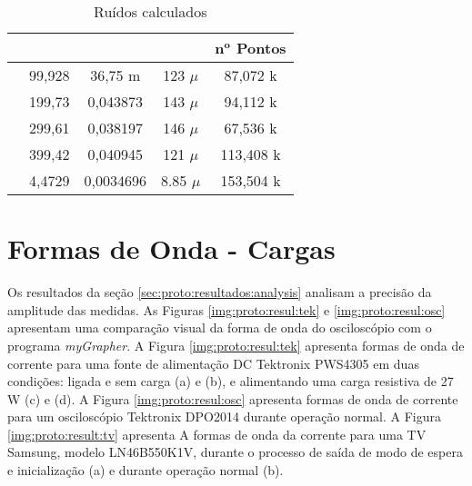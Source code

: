 				\begin{table}
					\caption{Ruídos calculados}
					\label{tab:proto:noise}
					\centering
					\begin{tabular}{c|c|c|c|c|}
						\cline{2-5}
						&		&		&		&	\thead{$\mathbf{n^o}$\\\textbf{Pontos}}	\\
						\hline
						 &	99,928	&	36,75 m	&	123 $\mu$		&	87,072 k	\\
								&	199,73	&	0,043873	&	143 $\mu$		&	94,112 k	\\
						\cline{2-5}
								&	299,61	&	0,038197	&	146 $\mu$		&	67,536 k	\\
						\cline{2-5}
								&	399,42	&	0,040945	&	121 $\mu$		&	113,408 k	\\
						\hline
							&	4,4729		&	0,0034696	&	8.85 $\mu$	&	153,504 k	\\
						\hline
					\end{tabular}
				\end{table}


	\section{Formas de Onda - Cargas}\label{sec:proto:resultados:testes}

		Os resultados da seção \ref{sec:proto:resultados:analysis} analisam a precisão da amplitude das medidas. As Figuras \ref{img:proto:resul:tek} e \ref{img:proto:resul:osc} apresentam uma comparação visual da forma de onda do osciloscópio com o programa \textit{myGrapher}. A Figura \ref{img:proto:resul:tek} apresenta formas de onda de corrente para uma fonte de alimentação DC Tektronix\textsuperscript{\textregistered} PWS4305 em duas condições: ligada e sem carga (a) e (b), e alimentando uma carga resistiva de 27 W (c) e (d). A Figura \ref{img:proto:resul:osc} apresenta formas de onda de corrente para um osciloscópio Tektronix\textsuperscript{\textregistered} DPO2014 durante operação normal. A Figura \ref{img:proto:result:tv} apresenta A formas de onda da corrente para uma TV Samsung\textsuperscript{\textregistered}, modelo LN46B550K1V, durante o processo de saída de modo de espera e inicialização (a) e durante operação normal (b).

